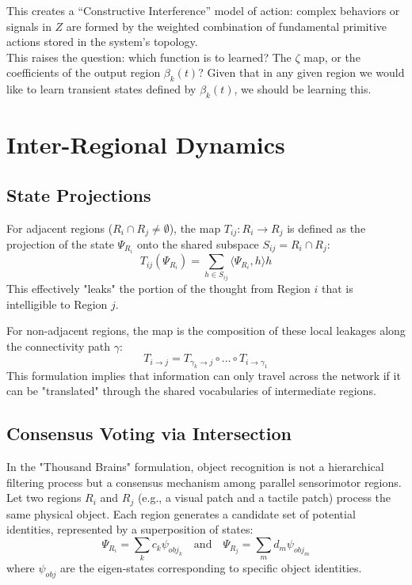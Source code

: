 \documentclass[twocolumn, 10pt]{article}
\begin{document}
This creates a ``Constructive Interference'' model of action: complex behaviors or signals in $Z$ are formed by the weighted combination of fundamental primitive actions stored in the system's topology. \\

This raises the question: which function is to learned? The $\zeta$ map, or the coefficients of the output region $\beta_k(t)$? Given that in any given region we would like to learn transient states defined by $\beta_k(t)$, we should be learning this.




\section{Inter-Regional Dynamics}
\subsection{State Projections}
For adjacent regions ($R_i \cap R_j \neq \emptyset$), the map $T_{ij}: R_i \to R_j$ is defined as the projection of the state $\Psi_{R_i}$ onto the shared subspace $S_{ij} = R_i \cap R_j$:
\begin{equation}
    T_{ij}(\Psi_{R_i}) = \sum_{h \in S_{ij}} \langle \Psi_{R_i}, h \rangle h
\end{equation}
This effectively "leaks" the portion of the thought from Region $i$ that is intelligible to Region $j$.

For non-adjacent regions, the map is the composition of these local leakages along the connectivity path $\gamma$:
\begin{equation}
    T_{i \to j} = T_{\gamma_k \to j} \circ \dots \circ T_{i \to \gamma_1}
\end{equation}
This formulation implies that information can only travel across the network if it can be "translated" through the shared vocabularies of intermediate regions.
\subsection{Consensus Voting via Intersection}
In the "Thousand Brains" formulation, object recognition is not a hierarchical filtering process but a consensus mechanism among parallel sensorimotor regions. Let two regions $R_i$ and $R_j$ (e.g., a visual patch and a tactile patch) process the same physical object. Each region generates a candidate set of potential identities, represented by a superposition of states:
\begin{equation}
    \Psi_{R_i} = \sum_k c_k \psi_{obj_k} \quad \text{and} \quad \Psi_{R_j} = \sum_m d_m \psi_{obj_m}
\end{equation}
where $\psi_{obj}$ are the eigen-states corresponding to specific object identities.
\end{document}
